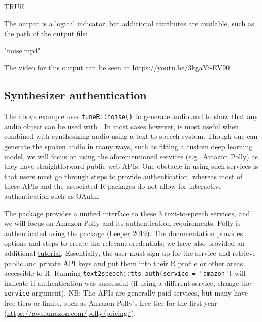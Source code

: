 \begin{Schunk}
\begin{Soutput}
[1] TRUE
\end{Soutput}
\end{Schunk}

The output is a logical indicator, but additional attributes are
available, such as the path of the output file:

\begin{Schunk}
\end{Schunk}

\begin{Schunk}
\begin{Soutput}
[1] "noise.mp4"
\end{Soutput}
\end{Schunk}

The video for this output can be seen at
\url{https://youtu.be/3kgaYf-EV90}.

\hypertarget{synthesizer-authentication}{%
\subsection{Synthesizer
authentication}\label{synthesizer-authentication}}

The above example uses \texttt{tuneR::noise()} to generate audio and to
show that any audio object can be used with . In most cases
however,  is most useful when combined with synthesizing audio
using a text-to-speech system. Though one can generate the spoken audio
in many ways, such as fitting a custom deep learning model, we will
focus on using the aforementioned services (e.g.~Amazon Polly) as they
have straightforward public web APIs. One obstacle in using such
services is that users must go through steps to provide authentication,
whereas most of these APIs and the associated R packages do not allow
for interactive authentication such as OAuth.

The  package provides a unified interface to these 3
text-to-speech services, and we will focus on Amazon Polly and its
authentication requirements. Polly is authenticated using the
 package (Leeper 2019). The 
documentation provides options and steps to create the relevant
credentials; we have also provided an additional
\href{http://seankross.com/2017/05/02/Access-Amazon-Web-Services-in-R.html}{tutorial}.
Essentially, the user must sign up for the service and retrieve public
and private API keys and put them into their R profile or other areas
accessible to R. Running
\texttt{text2speech::tts\_auth(service\ =\ "amazon")} will indicate if
authentication was successful (if using a different service, change the
\texttt{service} argument). NB: The APIs are generally paid services,
but many have free tiers or limits, such as Amazon Polly's free tier for
the first year (\url{https://aws.amazon.com/polly/pricing/}).

